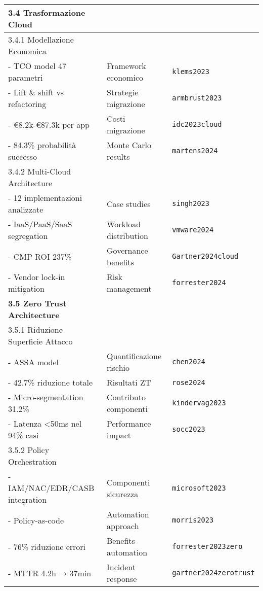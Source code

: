 \documentclass{article}
\begin{document}
\begin{longtable}{p{}|p{}|p{}}
\textbf{3.4 Trasformazione Cloud} & & \\
\midrule
3.4.1 Modellazione Economica & & \\
- TCO model 47 parametri & Framework economico & \texttt{klems2023} \\
- Lift \& shift vs refactoring & Strategie migrazione & \texttt{armbrust2023} \\
- €8.2k-€87.3k per app & Costi migrazione & \texttt{idc2023cloud} \\
- 84.3\% probabilità successo & Monte Carlo results & \texttt{martens2024} \\
\midrule
3.4.2 Multi-Cloud Architecture & & \\
- 12 implementazioni analizzate & Case studies & \texttt{singh2023} \\
- IaaS/PaaS/SaaS segregation & Workload distribution & \texttt{vmware2024} \\
- CMP ROI 237\% & Governance benefits & \texttt{Gartner2024cloud} \\
- Vendor lock-in mitigation & Risk management & \texttt{forrester2024} \\
\midrule

\textbf{3.5 Zero Trust Architecture} & & \\
\midrule
3.5.1 Riduzione Superficie Attacco & & \\
- ASSA model & Quantificazione rischio & \texttt{chen2024} \\
- 42.7\% riduzione totale & Risultati ZT & \texttt{rose2024} \\
- Micro-segmentation 31.2\% & Contributo componenti & \texttt{kindervag2023} \\
- Latenza <50ms nel 94\% casi & Performance impact & \texttt{socc2023} \\
\midrule
3.5.2 Policy Orchestration & & \\
- IAM/NAC/EDR/CASB integration & Componenti sicurezza & \texttt{microsoft2023} \\
- Policy-as-code & Automation approach & \texttt{morris2023} \\
- 76\% riduzione errori & Benefits automation & \texttt{forrester2023zero} \\
- MTTR 4.2h → 37min & Incident response & \texttt{gartner2024zerotrust} \\
\midrule


\end{longtable}
\end{document}
